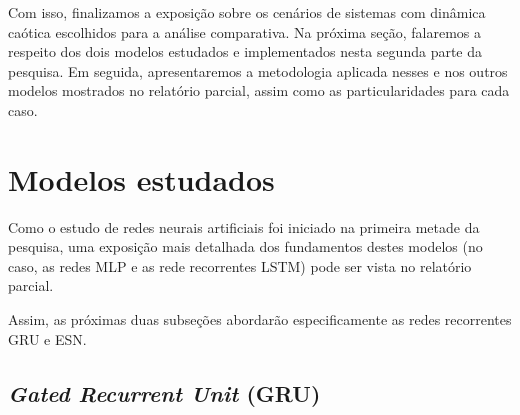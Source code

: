 \documentclass[a4paper, 12pt]{article}
\begin{document}
Com isso, finalizamos a exposição sobre os cenários de sistemas com dinâmica caótica escolhidos para a análise comparativa. Na próxima seção, falaremos a respeito dos dois modelos estudados e implementados nesta segunda parte da pesquisa. Em seguida, apresentaremos a metodologia aplicada nesses e nos outros modelos mostrados no relatório parcial, assim como as particularidades para cada caso.

\section{Modelos estudados}

Como o estudo de redes neurais artificiais foi iniciado na primeira metade da pesquisa, uma exposição mais detalhada dos fundamentos destes modelos (no caso, as redes MLP e as rede recorrentes LSTM) pode ser vista no relatório parcial.

Assim, as próximas duas subseções abordarão especificamente as redes recorrentes GRU e ESN.

\subsection{\textit{Gated Recurrent Unit} (GRU)}
\end{document}
